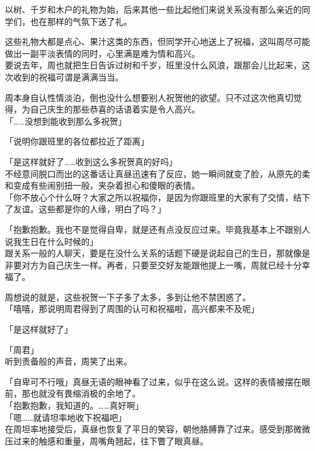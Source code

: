 以树、千岁和木户的礼物为始，后来其他一些比起他们来说关系没有那么亲近的同学们，也在那样的气氛下送了礼。

这些礼物大都是点心、果汁这类的东西，但同学开心地送上了祝福，这叫周尽可能做出一副平淡表情的同时，心里满是难为情和高兴。\\

要说去年，周也就把生日告诉过树和千岁，班里没什么风浪，跟那会儿比起来，这次收到的祝福可谓是满满当当。

周本身自认性情淡泊，倒也没什么想要别人祝贺他的欲望。只不过这次他真切觉得，为自己庆生的那些恭喜的话语着实是令人高兴。\\

「……没想到能收到那么多祝贺」

「说明你跟班里的各位都拉近了距离」

「是这样就好了……收到这么多祝贺真的好吗」\\

不经意间脱口而出的这番话让真昼迅速有了反应，她一瞬间就变了脸，从原先的柔和变成有些闹别扭一般，夹杂着担心和傻眼的表情。\\

「你不放心个什么呀？大家之所以祝福你，是因为你跟班里的大家有了交情，结下了友谊。这些都是你的人缘，明白了吗？」

「抱歉抱歉。我也不是觉得自卑，就是还有点没反应过来。毕竟我基本上不跟别人说我生日在什么时候的」\\

跟关系一般的人聊天，要是在没什么关系的话题下硬是说起自己的生日，那就像是非要对方为自己庆生一样。再者，只要至交好友能跟他提上一嘴，周就已经十分幸福了。

周想说的就是，这些祝贺一下子多了太多，多到让他不禁困惑了。\\

「嘻嘻，那说明周君得到了周围的认可和祝福啦，高兴都来不及呢」

「是这样就好了」

「周君」\\

听到责备般的声音，周笑了出来。

「自卑可不行哦」真昼无语的眼神看了过来，似乎在这么说。这样的表情被摆在眼前，那也就没有畏缩消极的余地了。\\

「抱歉抱歉，我知道的。……真好啊」\\

「嗯……就请坦率地收下祝福吧」\\

在周坦率地接受后，真昼也恢复了平日的笑容，朝他胳膊靠了过来。感受到那微微压过来的触感和重量，周嘴角翘起，往下瞥了眼真昼。

